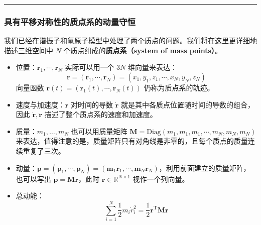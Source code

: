 \documentclass[cn,10pt,math=newtx,citestyle=gb7714-2015,bibstyle=gb7714-2015]{elegantbook}
\def\bm{\boldsymbol}
\def\mbf{\mathbf}
\def\R{\mathbb R}
\def\T{\mathrm T}
\def\srule{\noindent\rule{\linewidth}{0.3mm}}
\begin{document}
\srule

\subsubsection{具有平移对称性的质点系的动量守恒}
我们已经在谐振子和氢原子模型中处理了两个质点的问题。我们将在这里更详细地描述三维空间中 $N$ 个质点组成的\textbf{质点系（system of mass points）}。 

\begin{itemize}
    \item 位置：$\bm r_1,\cdots,\bm r_N$ 实际可以用一个 $3N$ 维向量来表达：
\begin{equation*}
    \bm r=(\bm r_1,\cdots,\bm r_N)=(x_1,y_1,z_1,\cdots,x_N,y_N,z_N)
\end{equation*}
    向量函数 $\bm r(t)=(\bm r_1(t),\cdots,\bm r_N(t))$ 仍称为质点系的轨迹。
    \item 速度与加速度：$\bm r$ 对时间的导数 $\dot{\bm r}$ 就是其中各质点位置随时间的导数的组合，因此 $\dot{\bm r},\ddot{\bm r}$ 描述了整个质点系的速度和加速度。
    \item 质量：$m_1,\dots,m_N$ 也可以用质量矩阵 $\mbf M = \text{Diag}(m_1,m_1,m_1,\cdots,m_N,m_N,m_N)$ 来表达，值得注意的是，质量矩阵只有对角线是非零的，且每个质点的质量连续重复了三次。
    \item 动量：$\bm p=(\bm p_1,\cdots,\bm p_N)=(\bm m_1\dot{\bm r}_1,\cdots,\bm m_N\dot{\bm r}_N)$，利用前面建立的质量矩阵，也可以写出 $\bm p = \mbf M\dot{\bm r}$，此时 $\bm r\in\R^{N\times 1}$ 视作一个列向量。
    \item 总动能：
    \begin{equation*}
        \sum_{i=1}^N\frac{1}{2}m_i\dot r_i^2 = \frac{1}{2}\bm r^\T \mbf M\bm r
    \end{equation*}
\end{itemize}
\end{document}
